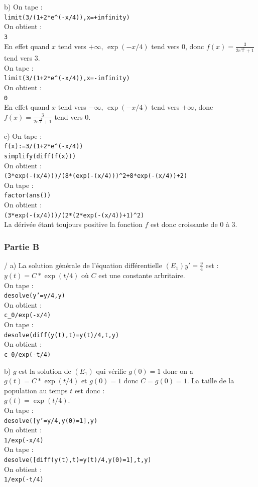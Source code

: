 \documentclass[a4paper,11pt]{book}
\begin{document}
b) On  tape :\\
{\tt limit(3/(1+2*e\verb|^|(-x/4)),x=+infinity)}\\
On obtient :\\
{\tt 3}\\
En effet quand $x$ tend vers $+\infty$, $\exp(-x/4)$ tend vers 0, donc
$f(x)=\frac{3}{2e^{\frac{-x}{4}}+1}$ tend vers 3.\\
On  tape :\\
{\tt limit(3/(1+2*e\verb|^|(-x/4)),x=-infinity)}\\
On obtient :\\
{\tt 0}\\
En effet quand $x$ tend vers $-\infty$, $\exp(-x/4)$ tend vers $+\infty$, donc
$f(x)=\frac{3}{2e^{\frac{-x}{4}}+1}$ tend vers 0.

c) On  tape :\\
{\tt f(x):=3/(1+2*e\verb|^|(-x/4))}\\
{\tt simplify(diff(f(x)))}\\
On obtient :\\
{\tt (3*exp(-(x/4)))/(8*(exp(-(x/4)))\verb|^|2+8*exp(-(x/4))+2)}\\
On  tape :\\
{\tt factor(ans())}\\
On obtient :\\
{\tt (3*exp(-(x/4)))/(2*(2*exp(-(x/4))+1)\verb|^|2)}\\
La d\'eriv\'ee \'etant toujours positive la fonction $f$ est donc croissante 
de 0 \`a 3.
\subsubsection{Partie B}
/ a) La solution g\'en\'erale de l'\'equation diff\'erentielle 
$\displaystyle (E_1)  y'=\frac{y}{4}$ est :\\
 $y(t)=C*\exp(t/4)$ o\`u $C$ est une 
constante arbritaire.\\
On tape :\\
{\tt desolve(y'=y/4,y)}\\
On obtient :\\
{\tt c\_0/exp(-x/4)}\\
On tape :\\
{\tt desolve(diff(y(t),t)=y(t)/4,t,y)}\\
On obtient :\\
{\tt c\_0/exp(-t/4)}

b) $g$ est la solution de $(E_1)$ qui v\'erifie $g(0)=1$ donc on a 
$g(t)=C*\exp(t/4)$ et $g(0)=1$ donc $C=g(0)=1$. La taille de la population au 
temps $t$ est donc :\\
$g(t)=\exp(t/4)$.\\
On tape :\\
{\tt desolve([y'=y/4,y(0)=1],y)}\\
On obtient :\\
{\tt 1/exp(-x/4)}\\
On tape :\\
{\tt desolve([diff(y(t),t)=y(t)/4,y(0)=1],t,y)}\\
On obtient :\\
{\tt 1/exp(-t/4)}
\end{document}

